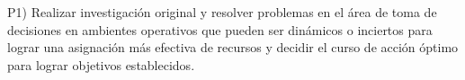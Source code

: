 P1) Realizar investigaci\'{o}n original y resolver problemas en el \'{a}rea de
toma de decisiones en ambientes operativos que pueden ser din\'{a}micos o
inciertos para lograr una asignaci\'{o}n m\'{a}s efectiva de recursos y
decidir el curso de acci\'{o}n \'{o}ptimo para lograr objetivos establecidos.
